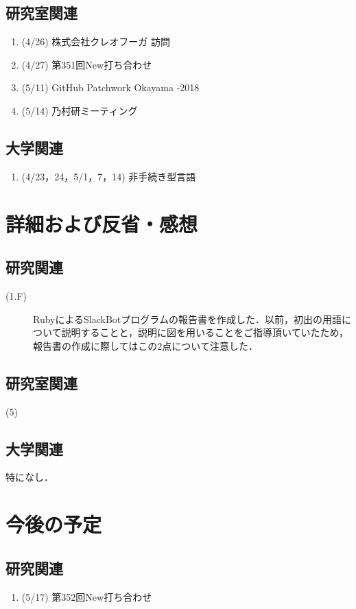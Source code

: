 \documentclass[12pt]{jsarticle}
\begin{document}
\subsection{研究室関連}\label{kenkyuushitu}
\begin{enumerate}
\item (4/26) 株式会社クレオフーガ 訪問
\item (4/27) 第351回New打ち合わせ
\item (5/11) GitHub Patchwork Okayama -2018
\item (5/14) 乃村研ミーティング
\end{enumerate}
\subsection{大学関連}\label{daigaku}
\begin{enumerate}
\item (4/23，24，5/1，7，14) 非手続き型言語
\end{enumerate}

\section{詳細および反省・感想}
\subsection{研究関連}
\begin{description}
\item[(1.F)] RubyによるSlackBotプログラムの報告書を作成した．以前，初出の用語について説明することと，説明に図を用いることをご指導頂いていたため，報告書の作成に際してはこの2点について注意した．
\end{description}
\subsection{研究室関連}
\begin{description}
\item[(5)]
\end{description}
\subsection{大学関連}
特になし．

\section{今後の予定}
\subsection{研究関連}
\begin{enumerate}
\item (5/17) 第352回New打ち合わせ
\end{enumerate}
\end{document}
